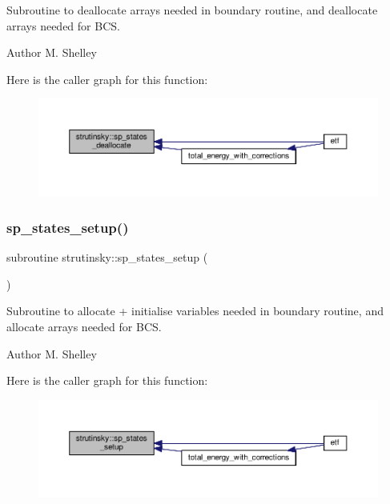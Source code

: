 Subroutine to deallocate arrays needed in \textquotesingle{}boundary\textquotesingle{} routine, and deallocate arrays needed for B\+CS. 

\begin{DoxyAuthor}{Author}
M. Shelley 
\end{DoxyAuthor}
Here is the caller graph for this function\+:
\nopagebreak
\begin{figure}[H]
\begin{center}
\leavevmode
\includegraphics[width=350pt]{namespacestrutinsky_a0a07c6adfd14cbf345bf96b70d3f5d82_icgraph}
\end{center}
\end{figure}
\mbox{\label{namespacestrutinsky_a6eeba7570095328226f37df3e89b7a18}} 
\subsubsection{\texorpdfstring{sp\+\_\+states\+\_\+setup()}{sp\_states\_setup()}}
{\footnotesize\ttfamily subroutine strutinsky\+::sp\+\_\+states\+\_\+setup (\begin{DoxyParamCaption}{ }\end{DoxyParamCaption})}



Subroutine to allocate + initialise variables needed in \textquotesingle{}boundary\textquotesingle{} routine, and allocate arrays needed for B\+CS. 

\begin{DoxyAuthor}{Author}
M. Shelley 
\end{DoxyAuthor}
Here is the caller graph for this function\+:
\nopagebreak
\begin{figure}[H]
\begin{center}
\leavevmode
\includegraphics[width=350pt]{namespacestrutinsky_a6eeba7570095328226f37df3e89b7a18_icgraph}
\end{center}
\end{figure}
\mbox{\label{namespacestrutinsky_a106e8ec285383b5042e8436a2376147a}} 
